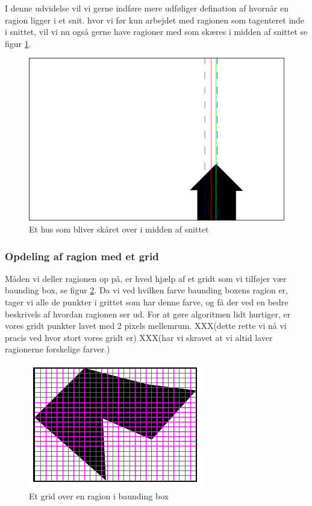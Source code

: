{
I denne udvidelse vil vi gerne indføre mere udføliger defination af
hvornår en ragion ligger i et snit. hvor vi før kun arbejdet med
ragionen som tagenteret inde i snittet, vil vi nu også gerne have
ragioner med som skæres i midden af snittet se figur
\ref{hus}.

\begin{figure}[h]
	\begin{center}
		\includegraphics[scale=0.3,angle=0]{afsnit/vores_implementation/billeder/udvidet_loesning/husworks.png}
	\end{center}
	\caption[]{Et hus som bliver skåret over i midden af snittet}
	\label{hus}
\end{figure}

\subsubsection{Opdeling af ragion med et grid}
Måden vi deller ragionen op på, er hved hjælp af et gridt som vi
tilføjer vær baunding box, se figur \ref{grid}. Da vi ved hvilken farve
baunding boxens ragion er, tager vi alle de punkter i grittet som har
denne farve, og få der ved en bedre beskrivels af hvordan ragionen ser
ud. For at gøre algoritmen lidt hurtiger, er vores gridt punkter lavet
med 2 pixels mellemrum. XXX(dette rette vi nå vi pracis ved hvor stort
vores gridt er) XXX(har vi skravet at vi altid laver ragionerne
forskelige farver.)

\begin{figure}[h]
	\begin{center}
		\includegraphics[scale=0.76,angle=0]{afsnit/vores_implementation/billeder/udvidet_loesning/udvidetloesninglayer.png}
	\end{center}
	\caption[]{Et grid over en ragion i baunding box}
	\label{grid}
\end{figure}

}
